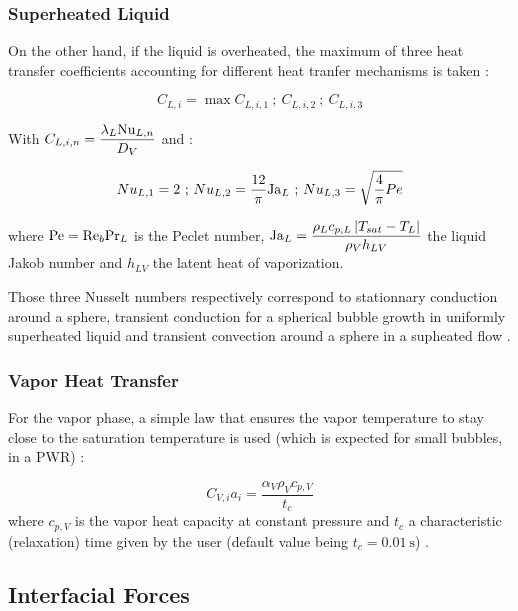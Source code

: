 \subsubsection{Superheated Liquid}

On the other hand, if the liquid is overheated, the maximum of three heat transfer coefficients accounting for different heat tranfer mechanisms is taken \cite{berne_analyse_1983}:

\begin{equation}
C_{L,i}=\max{C_{L,i,1}\ ;\ C_{L,i,2}\ ;\ C_{L,i,3}}
\label{eq:ncfd_supheat_L}
\end{equation}

With $C_{L,i,n}=\dfrac{\lambda_{L}\mathrm{Nu}_{L,n}}{D_{V}}$ and :

\begin{equation}
\label{eq:nusselt}
 Nu_{L,1}=2 \text{ ; } Nu_{L,2}=\frac{12}{\pi} \mathrm{Ja}_{L} \text{ ; }  Nu_{L,3}=\sqrt{\frac{4}{\pi}Pe} 
\end{equation}


where $\mathrm{Pe}=\mathrm{Re}_{b} \mathrm{Pr}_{L}$ is the Peclet number, $\mathrm{Ja}_{L}=\dfrac{ \rho_{L}c_{p,L}\left| T_{sat}-T_{L} \right|}{\rho_{V} h_{LV}} $ the liquid Jakob number and $h_{LV}$ the latent heat of vaporization. 

\npar

Those three Nusselt numbers respectively correspond to stationnary conduction around a sphere, transient conduction for a spherical bubble growth in uniformly superheated liquid \cite{plesset_growth_1954} and transient convection around a sphere in a supheated flow \cite{ruckenstein_mass_1964}.

\subsubsection{Vapor Heat Transfer}

For the vapor phase, a simple law that ensures the vapor temperature to stay close to the saturation temperature is used (which is expected for small bubbles, \eg in a PWR) :

\begin{equation}
C_{V,i}a_{i}=\frac{\alpha_{V}\rho_{V}c_{p,V}}{t_{c}}
\label{eq:ncfd_vap_relaxation}
\end{equation}
where $c_{p,V}$ is the vapor heat capacity at constant pressure and $t_{c}$ a characteristic (relaxation) time given by the user (default value being $t_{c}=0.01\ \text{s}$) .

\subsection{Interfacial Forces}
\label{subsec:ncfd_interf_qdm}


